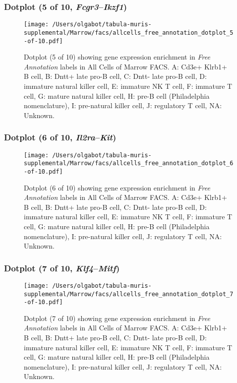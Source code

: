 \clearpage

\subsubsection{Dotplot (5 of 10, \emph{Fcgr3}--\emph{Ikzf1})}
\begin{figure}[h]
\centering
\texttt{[image: /Users/olgabot/tabula-muris-supplemental/Marrow/facs/allcells\_free\_annotation\_dotplot\_5-of-10.pdf]}

\caption{ Dotplot (5 of 10)  showing gene expression enrichment in \emph{Free Annotation} labels in All Cells of Marrow FACS. A: Cd3e+ Klrb1+ B cell, B: Dntt+ late pro-B cell, C: Dntt- late pro-B cell, D: immature natural killer cell, E: immature NK T cell, F: immature T cell, G: mature natural killer cell, H: pre-B cell (Philadelphia nomenclature), I: pre-natural killer cell, J: regulatory T cell, NA: Unknown.}
\end{figure}


\clearpage

\subsubsection{Dotplot (6 of 10, \emph{Il2ra}--\emph{Kit})}
\begin{figure}[h]
\centering
\texttt{[image: /Users/olgabot/tabula-muris-supplemental/Marrow/facs/allcells\_free\_annotation\_dotplot\_6-of-10.pdf]}

\caption{ Dotplot (6 of 10)  showing gene expression enrichment in \emph{Free Annotation} labels in All Cells of Marrow FACS. A: Cd3e+ Klrb1+ B cell, B: Dntt+ late pro-B cell, C: Dntt- late pro-B cell, D: immature natural killer cell, E: immature NK T cell, F: immature T cell, G: mature natural killer cell, H: pre-B cell (Philadelphia nomenclature), I: pre-natural killer cell, J: regulatory T cell, NA: Unknown.}
\end{figure}


\clearpage

\subsubsection{Dotplot (7 of 10, \emph{Klf4}--\emph{Mitf})}
\begin{figure}[h]
\centering
\texttt{[image: /Users/olgabot/tabula-muris-supplemental/Marrow/facs/allcells\_free\_annotation\_dotplot\_7-of-10.pdf]}

\caption{ Dotplot (7 of 10)  showing gene expression enrichment in \emph{Free Annotation} labels in All Cells of Marrow FACS. A: Cd3e+ Klrb1+ B cell, B: Dntt+ late pro-B cell, C: Dntt- late pro-B cell, D: immature natural killer cell, E: immature NK T cell, F: immature T cell, G: mature natural killer cell, H: pre-B cell (Philadelphia nomenclature), I: pre-natural killer cell, J: regulatory T cell, NA: Unknown.}
\end{figure}


